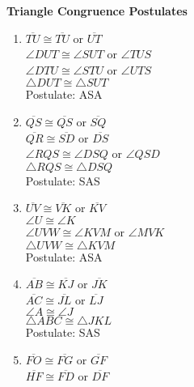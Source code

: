 \begin{center}
\textbf{Triangle Congruence Postulates}\\
\end{center}

\vspace*{1ex}

\begin{enumerate}[label = \arabic*. ]

\item $\overline{TU} \cong \overline{TU} $ or $\overline{UT}$ \redcheck \\
$\angle{DUT} \cong \angle{SUT} $ or $\angle{TUS} $ \redcheck \\
$\angle{DTU} \cong \angle{STU}$ or $\angle{UTS} $ \redcheck \\
$\triangle{DUT} \cong \triangle{SUT} $ \redcheck \\
Postulate: ASA \redcheck
\item $\overline{QS} \cong \overline{QS}$ or $\overline{SQ}$ \redcheck \\
$\overline{QR} \cong \overline{SD}$ or $\overline{DS}$ \redcheck \\
$\angle{RQS} \cong \angle{DSQ}$ or $\angle{QSD}$ \redcheck \\
$\triangle{RQS} \cong \triangle{DSQ}$ \redcheck \\
Postulate: SAS \redcheck
\item $\overline{UV} \cong \overline{VK}$ or $\overline{KV}$ \redcheck \\
$\angle{U} \cong \angle{K}$  \redcheck \\
$\angle{UVW} \cong \angle{KVM}$ or $\angle{MVK}$ \redcheck \\
$\triangle{UVW} \cong \triangle{KVM}$ \redcheck \\
Postulate: ASA\redcheck
\item $\overline{AB} \cong \overline{KJ}$ or $\overline{JK}$ \redcheck \\
$\overline{AC} \cong \overline{JL}$ or $\overline{LJ}$ \redcheck \\
$\angle{A} \cong \angle{J}$ \redcheck \\
$\triangle{ABC} \cong \triangle{JKL}$ \redcheck \\
Postulate: SAS\redcheck
\item $\overline{FO} \cong \overline{FG}$ or $\overline{GF}$ \redcheck \\
$\overline{HF} \cong \overline{FD}$ or $\overline{DF}$ \redcheck \\

\end{enumerate}
